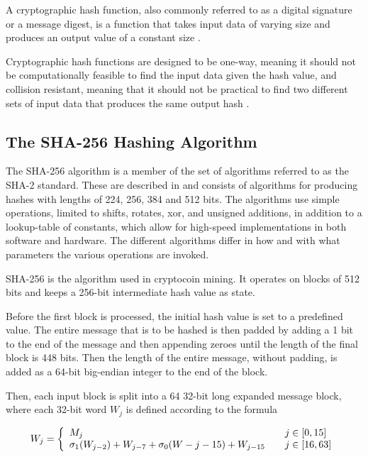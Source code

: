 A cryptographic hash function, also commonly referred to as a digital signature or
a message digest, is a function that takes input data of varying size and
produces an output value of a constant size \cite{hashing-overview}.

Cryptographic hash functions are designed to be one-way, meaning it should
not be computationally feasible to find the input data given the hash value,
and collision resistant, meaning that it should not be practical to find two
different sets of input data that produces the same output hash \cite{sha-spec}.

\subsection{The SHA-256 Hashing Algorithm}
\label{sec:hashing-algo}

The SHA-256 algorithm is a member of the set of algorithms referred to as the SHA-2 standard.
These are described in \cite{fips180-4} and consists of algorithms for producing hashes with lengths of 224, 256, 384 and 512 bits.
The algorithms use simple operations, limited to shifts, rotates, xor, and unsigned additions,
in addition to a lookup-table of constants, which allow for high-speed implementations in both
software and hardware. The different algorithms differ in how and with what parameters the various
operations are invoked.

SHA-256 is the algorithm used in cryptocoin mining. It operates on blocks of 512 bits
and keeps a 256-bit intermediate hash value as state.

Before the first block is processed, the initial hash value is set to a predefined
value. The entire message that is to be hashed is then padded by adding a 1 bit to
the end of the message and then appending zeroes until the length of the final block
is 448 bits. Then the length of the entire message, without padding, is added as a
64-bit big-endian integer to the end of the block.

Then, each input block is split into a 64 32-bit long expanded message block, where
each 32-bit word $W_j$ is defined according to the formula

\[ W_j = \left\{
	\begin{array}{l l}
		M_j & \quad j \in \left[0, 15\right]\\
		\sigma_1(W_{j - 2}) + W_{j - 7} + \sigma_0(W-{j - 15}) + W_{j - 15} & \quad j \in \left[16, 63\right]
	\end{array}
\right.\]


